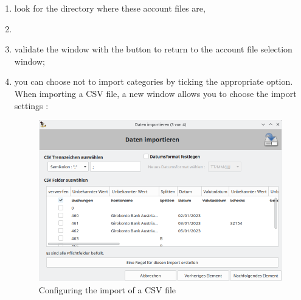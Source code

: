 \begin{enumerate}
\begin{enumerate}
\begin{figure}[htbp]
			\end{figure}
			\item look for the directory where these account files are,
			\item
			\item validate the window with the  button to return to the account file selection window;
			\item you can choose not to import categories by ticking the appropriate option. When importing a \gls{CSV} file, a new window allows you to choose the import settings :
				\begin{itemize}[label=\textopenbullet]
					\begin{figure}[htbp]
						\raggedleft
						\includegraphics[width=.95\textwidth]{image/screenshot/importexport_import_CSV_setup}
						\caption{Configuring the import of a CSV file}%

\end{figure}
\end{itemize}
\end{enumerate}
\end{enumerate}
